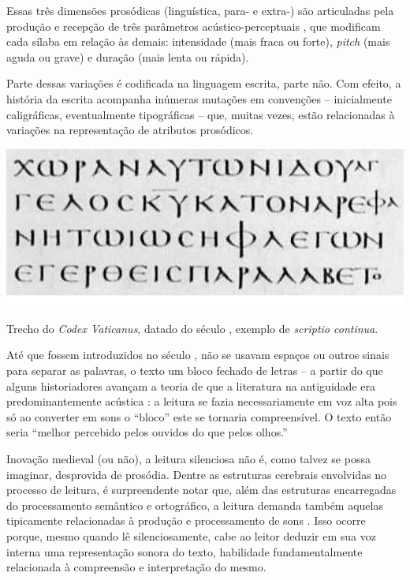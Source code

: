 \documentclass[a4paper]{tufte-handout}
\newcommand{\textls}[2][5]{%
    \begingroup\addfontfeatures{LetterSpace=#1}#2\endgroup
  }
\renewcommand{\smallcapsspacing}[1]{\textls[10]{#1}}
\renewcommand{\textsc}[1]{\smallcapsspacing{\textsmallcaps{#1}}}
\begin{document}
Essas três dimensões prosódicas (linguística, para- e extra-) são articuladas pela produção e recepção de três parâmetros acústico-perceptuais , que modificam cada sílaba em relação às demais: intensidade (mais fraca ou forte), \textit{pitch} (mais aguda ou grave) e duração (mais lenta ou rápida).

Parte dessas variações é codificada na linguagem escrita, parte não. Com efeito, a história da escrita acompanha inúmeras mutações em convenções -- inicialmente caligráficas, eventualmente tipográficas -- que, muitas vezes, estão relacionadas à variações na representação de atributos prosódicos. 

\begin{marginfigure}
  \includegraphics{imgs/codex.png}
  \caption{Trecho do \textit{Codex Vaticanus}, datado do século \textsc{iv}, exemplo de \textit{scriptio continua}. \citep{codex_vaticanus}}
  \label{cdx_vat}
\end{marginfigure}

Até que fossem introduzidos no século \textsc{vii}, não se usavam espaços ou outros sinais para separar as palavras, o texto um bloco fechado de letras -- a partir do que alguns historiadores avançam a teoria de que a literatura na antiguidade era predominantemente acústica \citep{kuster2016}: a leitura se fazia necessariamente em voz alta pois só ao converter em sons o ``bloco'' este se tornaria compreensível. O texto então seria ``melhor percebido pelos ouvidos do que pelos olhos.'' \citep{nunlist1991}

Inovação medieval (ou não), a leitura silenciosa não é, como talvez se possa imaginar, desprovida de prosódia. Dentre as estruturas cerebrais envolvidas no processo de leitura, é surpreendente notar que, além das estruturas encarregadas do processamento semântico e ortográfico, a leitura demanda também aquelas tipicamente relacionadas à produção e processamento de sons \citep[cap.~7]{seidenberg2017}. Isso ocorre porque, mesmo quando lê silenciosamente, cabe ao leitor deduzir em sua voz interna uma representação sonora do texto, habilidade fundamentalmente relacionada à compreensão e interpretação do mesmo.
\end{document}
